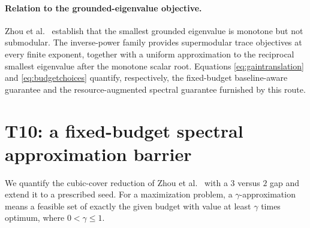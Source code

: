 \documentclass[11pt]{article}
\begin{document}
\paragraph{Relation to the grounded-eigenvalue objective.}
Zhou et al.~\cite{zhou2023} establish that the smallest grounded
eigenvalue is monotone but not submodular. The inverse-power family
provides supermodular trace objectives at every finite exponent,
together with a uniform approximation to the reciprocal smallest
eigenvalue after the monotone scalar root. Equations
\eqref{eq:gaintranslation} and \eqref{eq:budgetchoices} quantify,
respectively, the fixed-budget baseline-aware guarantee and the
resource-augmented spectral guarantee furnished by this route.

\section{T10: a fixed-budget spectral approximation barrier}
We quantify the cubic-cover reduction of Zhou et al.~\cite{zhou2023}
with a $3$ versus $2$ gap and extend it to a prescribed seed.
For a maximization problem, a $\gamma$-approximation means a
feasible set of exactly the given budget with value at least
$\gamma$ times optimum, where $0<\gamma\leq1$.
\end{document}
